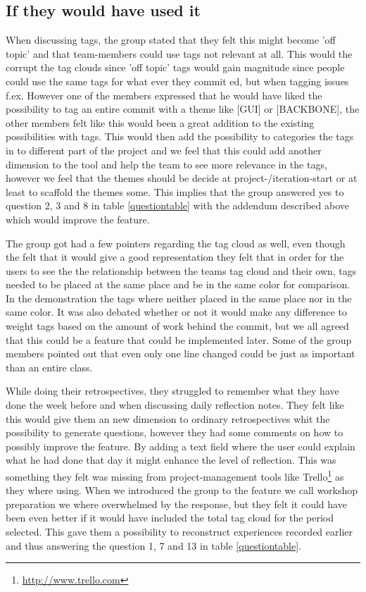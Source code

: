 \subsection{If they would have used it}
When discussing tags, the group stated that they felt this might become 'off topic' and that team-members could use tags not relevant at all. This would the corrupt the tag clouds since 'off topic' tags would gain magnitude since people could use the same tags for what ever they commit ed, but when tagging issues f.ex. However one of the members expressed that he would have liked the possibility to tag an entire commit with a theme like [GUI] or [BACKBONE], the other members felt like this would been a great addition to the existing possibilities with tags. This would then add the possibility to categories the tags in to different part of the project and we feel that this could add another dimension to the tool and help the team to see more relevance in the tags, however we feel that the themes should be decide at project-/iteration-start or at least to scaffold the themes some. This implies that the group answered yes to question 2, 3 and 8 in table \ref{questiontable} with the addendum described above which would improve the feature.

The group got had a few pointers regarding the tag cloud as well, even though the felt that it would give a good representation they felt that in order for the users to see the the relationship between the teams tag cloud and their own, tags needed to be placed at the same place and be in the same color for comparison. In the demonstration the tags where neither placed in the same place nor in the same color. It was also debated whether or not it would make any difference to weight tags based on the amount of work behind the commit, but we all agreed that this could be a feature that could be implemented later. Some of the group members pointed out that even only one line changed could be just as important than an entire class. 

While doing their retrospectives, they struggled to remember what they have done the week before and when discussing daily reflection notes. They felt like this would give them an new dimension to ordinary retrospectives whit the possibility to generate questions, however they had some comments on how to possibly improve the feature. By adding a text field where the user could explain what he had done that day it might enhance the level of reflection. This was something they felt was missing from project-management tools like Trello\footnote{\url{http://www.trello.com}} as they where using. When we introduced the group to the feature we call workshop preparation we where overwhelmed by the response, but they felt it could have been even better if it would have included the total tag cloud for the period selected. This gave them a possibility to reconstruct experiences recorded earlier and thus answering the question 1, 7 and 13 in table \ref{questiontable}.

